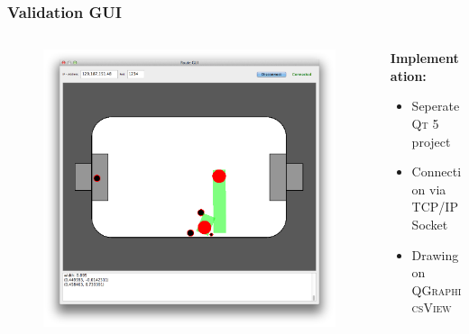 \documentclass[hyperref={pdfpagelabels=false}]{beamer}
\begin{document}
\begin{frame}
    \frametitle{Validation GUI}
    \begin{columns}[T]
        \begin{column}{0.4\textwidth}
            \begin{figure}
                \center
                \includegraphics[width=\textwidth]{Pictures/gui-1}
            \end{figure}
        \end{column}
        \begin{column}{0.6\textwidth}
            \textbf{Implementation:}
            \begin{itemize}
                \item Seperate \textsc{Qt 5} project
                \item Connection via TCP/IP Socket
                \item Drawing on \textsc{QGraphicsView}
            \end{itemize}
        \end{column}
    \end{columns}
\end{frame}
\end{document}
